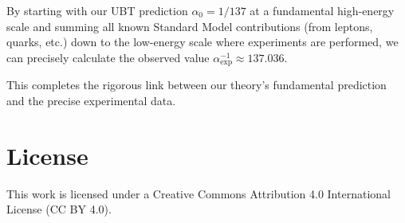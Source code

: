 \documentclass[12pt, a4paper]{article}
\begin{document}
By starting with our UBT prediction \( \alpha_0 = 1/137 \) at a fundamental high-energy scale and summing all known Standard Model contributions (from leptons, quarks, etc.) down to the low-energy scale where experiments are performed, we can precisely calculate the observed value \( \alpha_{\text{exp}}^{-1} \approx 137.036 \).

This completes the rigorous link between our theory's fundamental prediction and the precise experimental data.


\section*{License}
This work is licensed under a Creative Commons Attribution 4.0 International License (CC BY 4.0).
\end{document}
